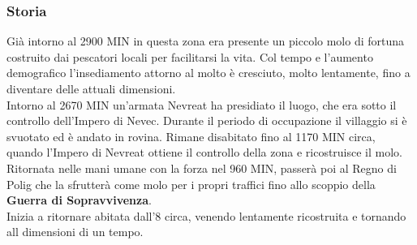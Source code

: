 \documentclass[10pt,twoside,onecolumn,openany]{book}
\begin{document}
\subsubsection{Storia}
Già intorno al 2900 MIN in questa zona era presente un piccolo molo di fortuna costruito dai pescatori locali per facilitarsi la vita. Col tempo e l'aumento demografico l'insediamento attorno al molto è cresciuto, molto lentamente, fino a diventare delle attuali dimensioni.\\
Intorno al 2670 MIN un'armata Nevreat ha presidiato il luogo, che era sotto il controllo dell'Impero di Nevec. Durante il periodo di occupazione il villaggio si è svuotato ed è andato in rovina. Rimane disabitato fino al 1170 MIN circa, quando l'Impero di Nevreat ottiene il controllo della zona e ricostruisce il molo. Ritornata nelle mani umane con la forza nel 960 MIN, passerà poi al Regno di Polig che la sfrutterà come molo per i propri traffici fino allo scoppio della \textbf{Guerra di Sopravvivenza}.\\
Inizia a ritornare abitata dall'8 circa, venendo lentamente ricostruita e tornando all dimensioni di un tempo.
\newpage
\end{document}
